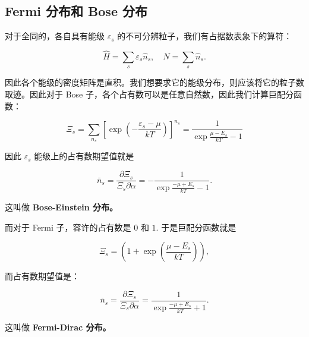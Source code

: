 \subsection{Fermi 分布和 Bose 分布}
对于全同的，各自具有能级 $\varepsilon_s$ 的不可分辨粒子，我们有占据数表象下的算符：
\begin{linenomath}\begin{equation}
\hat H = \sum_s \varepsilon_s \hat{n}_s,\quad  N = \sum_s \hat{n}_s.
\end{equation}\end{linenomath}
因此各个能级的密度矩阵是直积。我们想要求它的能级分布，则应该将它的粒子数取迹。因此对于 Bose 子，各个占有数可以是任意自然数，因此我们计算巨配分函数：
\begin{linenomath}\begin{equation}
\Xi_s = \sum_{n_s} \left[ \exp\left( -\frac{\varepsilon_s-\mu}{kT} \right)\right]^{n_s} = \frac{1}{\exp\frac{\mu-E_s}{kT}-1}
\end{equation}\end{linenomath}
因此 $\varepsilon_s$ 能级上的占有数期望值就是
\begin{linenomath}\begin{equation}
\boxed{\bar{n}_s =\frac{\partial \Xi_s}{\Xi_s\partial \alpha}= -\frac{1}{\exp\frac{-\mu+E_s}{kT}-1}}. \label{bose}
\end{equation}\end{linenomath}
这叫做 \textbf{Bose-Einstein 分布。}

而对于 Fermi 子，容许的占有数是 $0$ 和 $1.$ 于是巨配分函数就是 \begin{linenomath}\begin{equation}\Xi_s = \left( 1+\exp\left( \frac{\mu-E_s}{kT} \right) \right), \end{equation}\end{linenomath}而占有数期望值是：
\begin{linenomath}\begin{equation}
\boxed{\bar{n}_s =\frac{\partial \Xi_s}{\Xi_s\partial \alpha}= \frac{1}{\exp\frac{-\mu+E_s}{kT}+1}}. \label{fermi}
\end{equation}\end{linenomath}
这叫做 \textbf{Fermi-Dirac 分布。}









